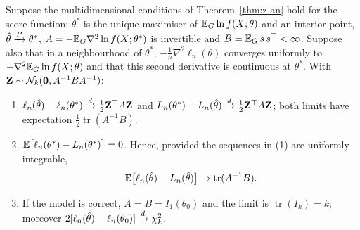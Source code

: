 \documentclass[main.tex]{subfiles}
\begin{document}
\begin{theorem}\label{thm:aic}
Suppose the multidimensional conditions of Theorem~\ref{thm:z-an} hold for the score function: $\theta^*$ is the unique maximiser of $\mathbb{E}_G\ln f(X;\theta)$ and an interior point, $\hat\theta\xrightarrow{P}\theta^*$, $A=-\mathbb{E}_G\nabla^2\ln f(X;\theta^*)$ is invertible and $B=\mathbb{E}_G\,s\,s^\top<\infty$. Suppose also that in a neighbourhood of $\theta^*$, $-\frac1n\nabla^2\ell_n(\theta)$ converges uniformly to $-\nabla^2\mathbb{E}_G\ln f(X;\theta)$ and that this second derivative is continuous at $\theta^*$. With $\mathbf Z\sim\mathcal{N}_k(\mathbf 0,A^{-1}BA^{-1})$:
\begin{enumerate}
  \item $\ell_n(\hat\theta)-\ell_n(\theta^*)\xrightarrow{d}\frac12\mathbf Z^\top A\mathbf Z$ and $L_n(\theta^*)-L_n(\hat\theta)\xrightarrow{d}\frac12\mathbf Z^\top A\mathbf Z$; both limits have expectation $\frac12\operatorname{tr}(A^{-1}B)$.
  \item $\mathbb{E}\big[\ell_n(\theta^*)-L_n(\theta^*)\big]=0$. Hence, provided the sequences in (1) are uniformly integrable,
  \[
  \mathbb{E}\big[\ell_n(\hat\theta)-L_n(\hat\theta)\big]\to\operatorname{tr}(A^{-1}B).
  \]
  \item If the model is correct, $A=B=I_1(\theta_0)$ and the limit is $\operatorname{tr}(I_k)=k$; moreover $2[\ell_n(\hat\theta)-\ell_n(\theta_0)]\xrightarrow{d}\chi^2_k$.
\end{enumerate}
\end{theorem}
\end{document}
